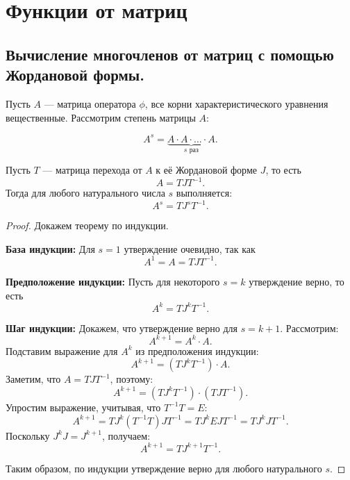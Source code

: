\chapter{Функции от матриц}

\section{Вычисление многочленов от матриц с помощью \\Жордановой формы.}

Пусть \( A \) — матрица оператора \( \phi \), все корни характеристического уравнения вещественные. Рассмотрим степень матрицы \( A \):

\[
A^s = \underbrace{A \cdot A \cdot \ldots \cdot A}_{s \text{ раз}}.
\]

\begin{shth}
    \begin{theorem}
        Пусть \( T \) — матрица перехода от \( A \) к её Жордановой форме \( J \), то есть
        \[
        A = T J T^{-1}.
        \]
        Тогда для любого натурального числа \( s \) выполняется:
        \[
        A^s = T J^s T^{-1}.
        \]
    \end{theorem}
\end{shth}

\begin{proof}
    Докажем теорему по индукции.

    \textbf{База индукции:} Для \( s = 1 \) утверждение очевидно, так как
    \[
    A^1 = A = T J T^{-1}.
    \]

    \textbf{Предположение индукции:} Пусть для некоторого \( s = k \) утверждение верно, то есть
    \[
    A^k = T J^k T^{-1}.
    \]

    \textbf{Шаг индукции:} Докажем, что утверждение верно для \( s = k + 1 \). Рассмотрим:
    \[
    A^{k+1} = A^k \cdot A.
    \]
    Подставим выражение для \( A^k \) из предположения индукции:
    \[
    A^{k+1} = (T J^k T^{-1}) \cdot A.
    \]
    Заметим, что \( A = T J T^{-1} \), поэтому:
    \[
    A^{k+1} = (T J^k T^{-1}) \cdot (T J T^{-1}).
    \]
    Упростим выражение, учитывая, что \( T^{-1} T = E \):
    \[
    A^{k+1} = T J^k (T^{-1} T) J T^{-1} = T J^k E J T^{-1} = T J^k J T^{-1}.
    \]
    Поскольку \( J^k J = J^{k+1} \), получаем:
    \[
    A^{k+1} = T J^{k+1} T^{-1}.
    \]

    Таким образом, по индукции утверждение верно для любого натурального \( s \).
\end{proof}

